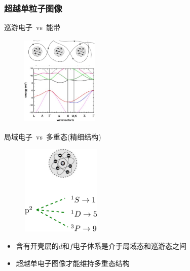 \frame
{
	\frametitle{超越单粒子图像}
\begin{minipage}[b]{0.49\linewidth}
	巡游电子~\textrm{vs}~能带 
\begin{figure}[h!]
\centering
\vspace{-5pt}
\includegraphics[height=1.7in,width=1.45in,viewport=0 0 860 950,clip]{Figures/Itinerant_electrons-bands.png}
\label{Itinerant-band}
\end{figure}
{\fontsize{7.2pt}{6.2pt}}
\end{minipage}
\hfill
\begin{minipage}[b]{0.49\linewidth}
	局域电子~\textrm{vs}~多重态(精细结构)
\begin{figure}[h!]
\centering
\vspace{-5pt}
\includegraphics[height=1.7in,width=1.50in,viewport=0 0 700 770,clip]{Figures/Localized_electrons-multiplets.png}
\label{Localized-multiplets}
\end{figure}
{\fontsize{7.2pt}{6.2pt}}
\end{minipage}
\begin{itemize}
\vspace{-12pt}
	\item 含有开壳层的$d$和$f$电子体系是介于局域态和巡游态之间
	\item 超越单电子图像才能维持多重态结构
\end{itemize}
}

